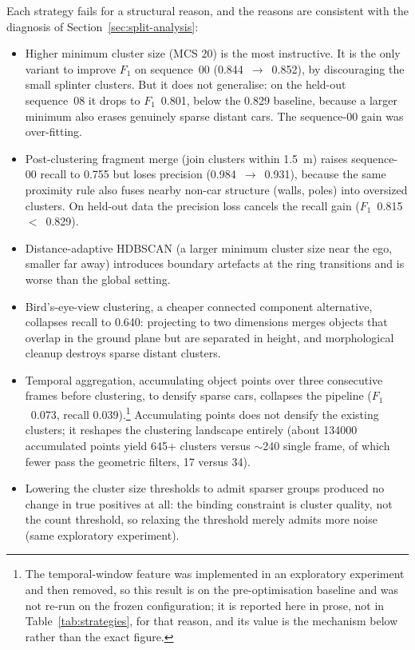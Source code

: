 Each strategy fails for a structural reason, and the reasons are consistent with the
diagnosis of Section~\ref{sec:split-analysis}:

\begin{itemize}
  \item Higher minimum cluster size (MCS \num{20}) is the most instructive.
    It is the only variant to improve $F_1$ on sequence~00
    (\num{0.844}~$\rightarrow$~\num{0.852}), by discouraging the small splinter
    clusters. But it does not generalise: on the held-out sequence~08 it drops to
    $F_1$~\num{0.801}, below the \num{0.829} baseline, because a larger
    minimum also erases genuinely sparse distant cars. The sequence-00 gain was
    over-fitting.
  \item Post-clustering fragment merge (join clusters within
    \SI{1.5}{\metre}) raises sequence-00 recall to \num{0.755} but loses precision
    (\num{0.984}~$\rightarrow$~\num{0.931}), because the same proximity rule also
    fuses nearby non-car structure (walls, poles) into oversized clusters. On
    held-out data the precision loss cancels the recall gain
    ($F_1$~\num{0.815}~$<$~\num{0.829}).
  \item Distance-adaptive HDBSCAN (a larger minimum cluster size near the
    ego, smaller far away) introduces boundary artefacts at the ring transitions and
    is worse than the global setting.
  \item Bird's-eye-view clustering, a cheaper
    connected component alternative, collapses recall to \num{0.640}: projecting to
    two dimensions merges objects that overlap in the ground plane but are separated
    in height, and morphological cleanup destroys sparse distant clusters.
  \item Temporal aggregation, accumulating object points over three
    consecutive frames before clustering, to densify sparse cars, collapses the
    pipeline ($F_1$~\num{0.073}, recall \num{0.039}).\footnote{The
    temporal-window feature was implemented in an exploratory experiment and then removed, so
    this result is on the pre-optimisation baseline and was not re-run on the frozen
    configuration; it is reported here in prose, not in Table~\ref{tab:strategies},
    for that reason, and its value is the mechanism below rather than the exact
    figure.} Accumulating points does not densify
    the existing clusters; it reshapes the clustering landscape entirely
    (about \num{134000} accumulated points yield \num{645}+ clusters versus
    $\sim$\num{240} single frame, of which fewer pass the geometric filters,
    \num{17} versus \num{34}).
  \item Lowering the cluster size thresholds to admit sparser groups
    produced no change in true positives at all: the binding constraint is cluster
    quality, not the count threshold, so relaxing the threshold merely admits more
    noise (same exploratory experiment).
\end{itemize}

